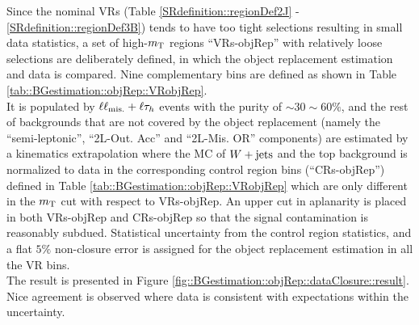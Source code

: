 Since the nominal VRs (Table \ref{SRdefinition::regionDef2J} - \ref{SRdefinition::regionDef3B}) tends to have too tight selections resulting in small data statistics, 
a set of high-$m_{\mathrm{T}}$ regions ``VRs-objRep'' with relatively loose selections are deliberately defined, in which the object replacement estimation and data is compared. Nine complementary bins are defined as shown in Table \ref{tab::BGestimation::objRep::VRobjRep}. \\

It is populated by $\ell\ell_{\mathrm{mis.}} + \ell\tau_h$ events with the purity of $\sim 30\sim60\%$, and the rest of backgrounds that are not covered by the object replacement (namely the ``semi-leptonic'', ``2L-Out. Acc'' and ``2L-Mis. OR'' components) are estimated by a kinematics extrapolation where the MC of $W+\mathrm{jets}$ and the top background is normalized to data in the corresponding control region bins (``CRs-objRep'') defined in Table \ref{tab::BGestimation::objRep::VRobjRep} which are only different in the $m_{\mathrm{T}}$ cut with respect to VRs-objRep. An upper cut in aplanarity is placed in both VRs-objRep and CRs-objRep so that the signal contamination is reasonably subdued. Statistical uncertainty from the control region statistics, and a flat $5\%$ non-closure error is assigned for the object replacement estimation in all the VR bins. \\

The result is presented in Figure \ref{fig::BGestimation::objRep::dataClosure::result}. 
Nice agreement is observed where data is consistent with expectations within the uncertainty. 

